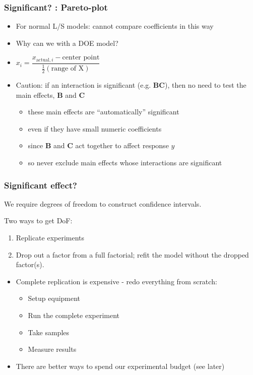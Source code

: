 \begin{frame}\frametitle{Significant? : Pareto-plot}
	\begin{itemize}
		\item	For normal L/S models: cannot compare coefficients in this way
		\item	Why can we with a DOE model?
		\item	$x_i = \dfrac{x_{\text{actual}, i}- \text{center point}}{\frac{1}{2} (\text{range of X})}$

		\begin{exampleblock}{}
			{}
		\end{exampleblock}
		
	\end{itemize}
	\begin{itemize}
		\item	Caution: if an interaction is significant (e.g. \textbf{BC}), then no need to test the main effects, \textbf{B} and \textbf{C}
		\begin{itemize}
			\item	these main effects are ``automatically'' significant
			\item	even if they have small numeric coefficients
			\item	since \textbf{B} and \textbf{C} act together to affect response $y$
			\item	so never exclude main effects whose interactions are significant
		\end{itemize}
	\end{itemize}
\end{frame}

\begin{frame}\frametitle{Significant effect?}

	We require degrees of freedom to construct confidence intervals.

	Two ways to get DoF:
	\begin{enumerate}
		\item	Replicate experiments
		\item	Drop out a factor from a full factorial; refit the model without the dropped factor(s).
	\end{enumerate}
	\begin{itemize}
		\item	Complete replication is expensive - redo everything from scratch:
		\begin{itemize}
			\item	Setup equipment
			\item	Run the complete experiment
			\item	Take samples
			\item	Measure results
		\end{itemize}
		\item	There are better ways to spend our experimental budget (see later)
	\end{itemize}
\end{frame}

